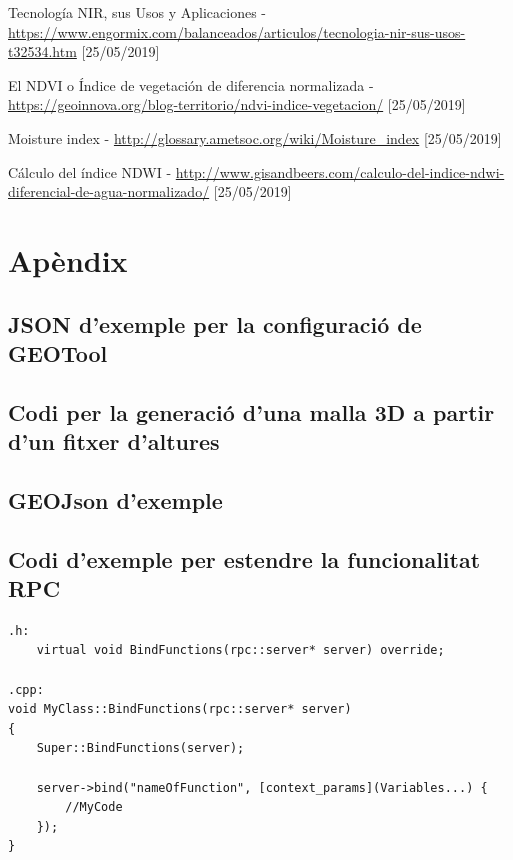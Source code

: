 \documentclass[10pt,a4paper,twocolumn,twoside]{article}
\begin{document}
\begin{thebibliography}{11}
Tecnología NIR, sus Usos y Aplicaciones - \url{https://www.engormix.com/balanceados/articulos/tecnologia-nir-sus-usos-t32534.htm} [25/05/2019]

El NDVI o Índice de vegetación de diferencia normalizada - \url{https://geoinnova.org/blog-territorio/ndvi-indice-vegetacion/} [25/05/2019]

Moisture index - \url{http://glossary.ametsoc.org/wiki/Moisture_index} [25/05/2019]

Cálculo del índice NDWI - \url{http://www.gisandbeers.com/calculo-del-indice-ndwi-diferencial-de-agua-normalizado/} [25/05/2019]

\end{thebibliography}

\appendix
\section*{Apèndix}

\setcounter{section}{1}

\subsection{JSON d'exemple per la configuració de GEOTool}
\label{appendix:geotoolconfig}


\subsection{Codi per la generació d'una malla 3D a partir d'un fitxer d'altures}
\label{appendix:generateobj}


\subsection{GEOJson d'exemple}
\label{appendix:geojson}


\subsection{Codi d'exemple per estendre la funcionalitat RPC}
\label{appendix:extendrpc}

\lstset{language=C} 
\begin{lstlisting}
.h:
	virtual void BindFunctions(rpc::server* server) override;
	
.cpp:
void MyClass::BindFunctions(rpc::server* server)
{
	Super::BindFunctions(server);

	server->bind("nameOfFunction", [context_params](Variables...) {
		//MyCode
	});
}

\end{lstlisting}
\end{document}
